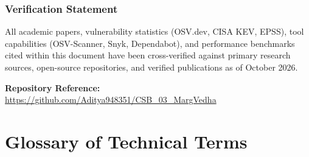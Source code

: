 \documentclass[12pt,a4paper,oneside]{report}
\begin{document}
\subsection*{Verification Statement}
All academic papers, vulnerability statistics (OSV.dev, CISA KEV, EPSS), tool capabilities (OSV-Scanner, Snyk, Dependabot), and performance benchmarks cited within this document have been cross-verified against primary research sources, open-source repositories, and verified publications as of October 2026.

\vfill
\begin{center}
    \textbf{Repository Reference:} \url{https://github.com/Aditya948351/CSB_03_MargVedha}
\end{center}

\clearpage
\tableofcontents
\clearpage
\listoffigures
\vspace{1cm}
\listoftables
\clearpage

\chapter*{Glossary of Technical Terms}
\end{document}
